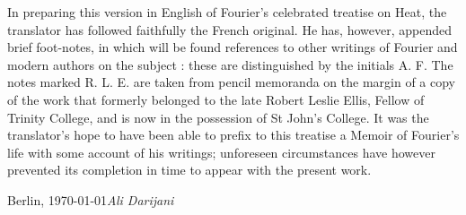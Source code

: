 %
%

\preface


In preparing this version in English of Fourier's celebrated treatise on Heat, the translator has followed
faithfully the French original. He has, however, appended brief foot-notes, in which will be found references 
to other writings of Fourier and modern authors on the subject : these are distinguished by the initials A. F.
 The notes marked R. L. E. are taken from pencil memoranda on the margin of a copy of the work that formerly 
 belonged to the late Robert Leslie Ellis, Fellow of Trinity College, and is now in the possession of St John's
  College. It was the translator's hope to have been able to prefix to this treatise a Memoir of Fourier's 
  life with some account of his writings; unforeseen circumstances have however prevented its completion in 
  time to appear with the present work.

\vspace{\baselineskip}
\begin{flushright}\noindent
Berlin, \today \hfill {\it Ali Darijani}\\
\end{flushright}
